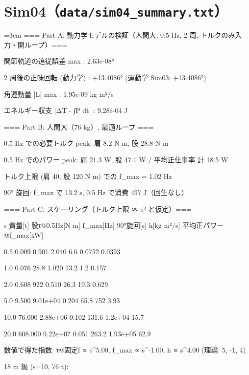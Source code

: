 \section{Sim04（\texttt{data/sim04\_summary.txt}）}
{\footnotesize\raggedright\sloppy\setlength{\parindent}{0pt}\setlength{\parskip}{0pt}\emergencystretch=3em
=== Part A: 動力学モデルの検証（人間大, 0.5 Hz, 2 周, トルクのみ入力・開ループ）===\par
関節軌道の追従誤差 max      : 2.63e-08°\par
2 周後の正味回転 (動力学)   : +13.4086°  (運動学 Sim03: +13.4086°)\par
角運動量 |L| max            : 1.95e-09 kg m²/s\par
エネルギー収支 |ΔT - ∫P dt| : 9.28e-04 J\par
\mbox{}\par
=== Part B: 人間大（76 kg）, 最適ループ ===\par
0.5 Hz での必要トルク peak: 肩 8.2 N m, 股 28.8 N m\par
0.5 Hz でのパワー peak: 肩 21.3 W, 股 47.1 W / 平均正仕事率 計 18.5 W\par
トルク上限 (肩 40, 股 120 N m) での f\_max = 1.02 Hz\par
90° 旋回: f\_max で 13.2 s, 0.5 Hz で消費 497 J（回生なし）\par
\mbox{}\par
=== Part C: スケーリング（トルク上限 ∝ s³ と仮定）===\par
 s   質量[t]  股τ@0.5Hz[N m]  f\_max[Hz]  90°旋回[s]  h[kg m²/s]  平均正パワー@f\_max[kW]\par
 0.5    0.009          0.901      2.040        6.6      0.0752       0.0393\par
 1.0    0.076           28.8      1.020       13.2         1.2        0.157\par
 2.0    0.608            922      0.510       26.3        19.3        0.629\par
 5.0    9.500       9.01e+04      0.204       65.8         752         3.93\par
10.0   76.000       2.88e+06      0.102      131.6     1.2e+04         15.7\par
20.0  608.000       9.22e+07      0.051      263.2    1.93e+05         62.9\par
数値で得た指数: τ@固定f ∝ s\^{}5.00, f\_max ∝ s\^{}-1.00, h ∝ s\^{}4.00  (理論: 5, -1, 4)\par
\mbox{}\par
18 m 級 (s=10, 76 t):\par
}
